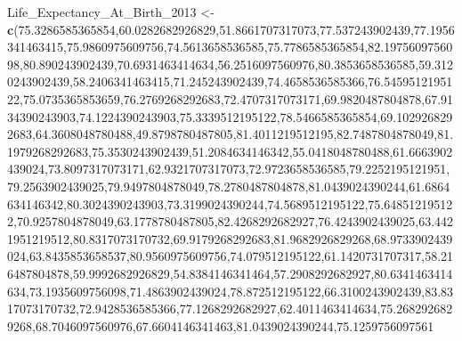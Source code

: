 \documentclass[]{article}
\newenvironment{Shaded}{\begin{snugshade}}{\end{snugshade}}
\newcommand{\DecValTok}[1]{\textcolor[rgb]{0.00,0.00,0.81}{#1}}
\newcommand{\FloatTok}[1]{\textcolor[rgb]{0.00,0.00,0.81}{#1}}
\newcommand{\KeywordTok}[1]{\textcolor[rgb]{0.13,0.29,0.53}{\textbf{#1}}}
\newcommand{\NormalTok}[1]{#1}
\newcommand{\StringTok}[1]{\textcolor[rgb]{0.31,0.60,0.02}{#1}}
\begin{document}
\begin{Shaded}
\begin{Highlighting}[]
\NormalTok{Life_Expectancy_At_Birth_}\DecValTok{2013}\NormalTok{ <-}\StringTok{ }\KeywordTok{c}\NormalTok{(}\FloatTok{75.3286585365854}\NormalTok{,}\FloatTok{60.0282682926829}\NormalTok{,}\FloatTok{51.8661707317073}\NormalTok{,}\FloatTok{77.537243902439}\NormalTok{,}\FloatTok{77.1956341463415}\NormalTok{,}\FloatTok{75.9860975609756}\NormalTok{,}\FloatTok{74.5613658536585}\NormalTok{,}\FloatTok{75.7786585365854}\NormalTok{,}\FloatTok{82.1975609756098}\NormalTok{,}\FloatTok{80.890243902439}\NormalTok{,}\FloatTok{70.6931463414634}\NormalTok{,}\FloatTok{56.2516097560976}\NormalTok{,}\FloatTok{80.3853658536585}\NormalTok{,}\FloatTok{59.3120243902439}\NormalTok{,}\FloatTok{58.2406341463415}\NormalTok{,}\FloatTok{71.245243902439}\NormalTok{,}\FloatTok{74.4658536585366}\NormalTok{,}\FloatTok{76.5459512195122}\NormalTok{,}\FloatTok{75.0735365853659}\NormalTok{,}\FloatTok{76.2769268292683}\NormalTok{,}\FloatTok{72.4707317073171}\NormalTok{,}\FloatTok{69.9820487804878}\NormalTok{,}\FloatTok{67.9134390243903}\NormalTok{,}\FloatTok{74.1224390243903}\NormalTok{,}\FloatTok{75.3339512195122}\NormalTok{,}\FloatTok{78.5466585365854}\NormalTok{,}\FloatTok{69.1029268292683}\NormalTok{,}\FloatTok{64.3608048780488}\NormalTok{,}\FloatTok{49.8798780487805}\NormalTok{,}\FloatTok{81.4011219512195}\NormalTok{,}\FloatTok{82.7487804878049}\NormalTok{,}\FloatTok{81.1979268292683}\NormalTok{,}\FloatTok{75.3530243902439}\NormalTok{,}\FloatTok{51.2084634146342}\NormalTok{,}\FloatTok{55.0418048780488}\NormalTok{,}\FloatTok{61.6663902439024}\NormalTok{,}\FloatTok{73.8097317073171}\NormalTok{,}\FloatTok{62.9321707317073}\NormalTok{,}\FloatTok{72.9723658536585}\NormalTok{,}\FloatTok{79.2252195121951}\NormalTok{,}\FloatTok{79.2563902439025}\NormalTok{,}\FloatTok{79.9497804878049}\NormalTok{,}\FloatTok{78.2780487804878}\NormalTok{,}\FloatTok{81.0439024390244}\NormalTok{,}\FloatTok{61.6864634146342}\NormalTok{,}\FloatTok{80.3024390243903}\NormalTok{,}\FloatTok{73.3199024390244}\NormalTok{,}\FloatTok{74.5689512195122}\NormalTok{,}\FloatTok{75.648512195122}\NormalTok{,}\FloatTok{70.9257804878049}\NormalTok{,}\FloatTok{63.1778780487805}\NormalTok{,}\FloatTok{82.4268292682927}\NormalTok{,}\FloatTok{76.4243902439025}\NormalTok{,}\FloatTok{63.4421951219512}\NormalTok{,}\FloatTok{80.8317073170732}\NormalTok{,}\FloatTok{69.9179268292683}\NormalTok{,}\FloatTok{81.9682926829268}\NormalTok{,}\FloatTok{68.9733902439024}\NormalTok{,}\FloatTok{63.8435853658537}\NormalTok{,}\FloatTok{80.9560975609756}\NormalTok{,}\FloatTok{74.079512195122}\NormalTok{,}\FloatTok{61.1420731707317}\NormalTok{,}\FloatTok{58.216487804878}\NormalTok{,}\FloatTok{59.9992682926829}\NormalTok{,}\FloatTok{54.8384146341464}\NormalTok{,}\FloatTok{57.2908292682927}\NormalTok{,}\FloatTok{80.6341463414634}\NormalTok{,}\FloatTok{73.1935609756098}\NormalTok{,}\FloatTok{71.4863902439024}\NormalTok{,}\FloatTok{78.872512195122}\NormalTok{,}\FloatTok{66.3100243902439}\NormalTok{,}\FloatTok{83.8317073170732}\NormalTok{,}\FloatTok{72.9428536585366}\NormalTok{,}\FloatTok{77.1268292682927}\NormalTok{,}\FloatTok{62.4011463414634}\NormalTok{,}\FloatTok{75.2682926829268}\NormalTok{,}\FloatTok{68.7046097560976}\NormalTok{,}\FloatTok{67.6604146341463}\NormalTok{,}\FloatTok{81.0439024390244}\NormalTok{,}\FloatTok{75.1259756097561}\NormalTok
\end{Highlighting}
\end{Shaded}
\end{document}
